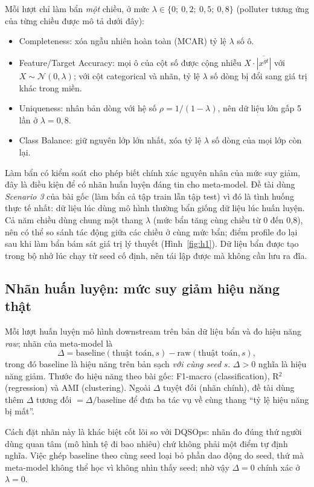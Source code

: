 Mỗi lượt chỉ làm bẩn \emph{một} chiều, ở mức $\lambda \in \{0;\ 0{,}2;\ 0{,}5;\ 0{,}8\}$ (polluter tương ứng của từng chiều được mô tả dưới đây):
\begin{itemize}
  \item Completeness: xóa ngẫu nhiên hoàn toàn (MCAR) tỷ lệ $\lambda$ số ô.
  \item Feature/Target Accuracy: mọi ô của cột số được cộng nhiễu $X\cdot\overline{|x^{gt}|}$ với $X\sim\mathcal{N}(0,\lambda)$; với cột categorical và nhãn, tỷ lệ $\lambda$ số dòng bị đổi sang giá trị khác trong miền.
  \item Uniqueness: nhân bản dòng với hệ số $\rho = 1/(1-\lambda)$, nên dữ liệu lớn gấp 5 lần ở $\lambda = 0{,}8$.
  \item Class Balance: giữ nguyên lớp lớn nhất, xóa tỷ lệ $\lambda$ số dòng của mọi lớp còn lại.
\end{itemize}
Làm bẩn có kiểm soát cho phép biết chính xác nguyên nhân của mức suy giảm, đây là điều kiện để có nhãn huấn luyện đáng tin cho meta-model. Đề tài dùng \emph{Scenario 3} của bài gốc (làm bẩn cả tập train lẫn tập test) vì đó là tình huống thực tế nhất: dữ liệu lúc dùng mô hình thường bẩn giống dữ liệu lúc huấn luyện. Cả năm chiều dùng chung một thang $\lambda$ (mức bẩn tăng cùng chiều từ 0 đến 0,8), nên có thể so sánh tác động giữa các chiều ở cùng mức bẩn; điểm profile đo lại sau khi làm bẩn bám sát giá trị lý thuyết (Hình~\ref{fig:h1}). Dữ liệu bẩn được tạo trong bộ nhớ lúc chạy từ seed cố định, nên tái lập được mà không cần lưu ra đĩa.

\subsection{Nhãn huấn luyện: mức suy giảm hiệu năng thật}

Mỗi lượt huấn luyện mô hình downstream trên bản dữ liệu bẩn và đo hiệu năng \emph{raw}; nhãn của meta-model là
\[
\Delta = \text{baseline}(\text{thuật toán}, s) - \text{raw}(\text{thuật toán}, s),
\]
trong đó baseline là hiệu năng trên bản sạch \emph{với cùng seed} $s$. $\Delta > 0$ nghĩa là hiệu năng giảm. Thước đo hiệu năng theo bài gốc: F1-macro (classification), R$^2$ (regression) và AMI \citep{vinh2010information} (clustering). Ngoài $\Delta$ tuyệt đối (nhãn chính), đề tài dùng thêm $\Delta$ tương đối $=\Delta/\text{baseline}$ để đưa ba tác vụ về cùng thang ``tỷ lệ hiệu năng bị mất''.

Cách đặt nhãn này là khác biệt cốt lõi so với DQSOps: nhãn đo đúng thứ người dùng quan tâm (mô hình tệ đi bao nhiêu) chứ không phải một điểm tự định nghĩa. Việc ghép baseline theo cùng seed loại bỏ phần dao động do seed, thứ mà meta-model không thể học vì không nhìn thấy seed; nhờ vậy $\Delta = 0$ chính xác ở $\lambda = 0$.

